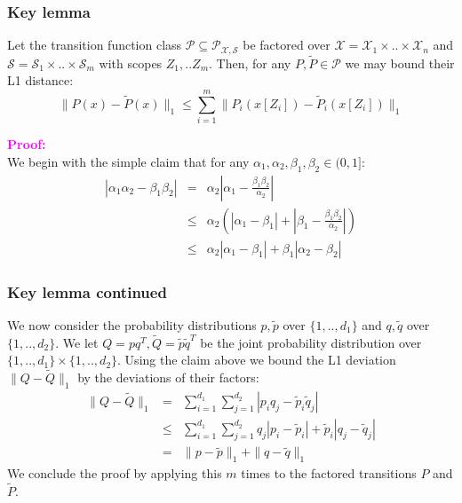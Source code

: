 \documentclass{beamer}
\newcommand{\Xc}{\mathcal{X}}
\newcommand{\Pc}{\mathcal{P}}
\newcommand{\Sc}{\mathcal{S}}
\newcommand{\hilite}[1]{\textcolor{magenta}{\textbf{#1}}}
\begin{document}
\begin{frame}
\frametitle{Key lemma}
\begin{lemma}
Let the transition function class $\Pc \subseteq \Pc_{\Xc,\Sc}$ be factored over $\Xc = \Xc_1 \times .. \times \Xc_n$ and $\Sc = \Sc_1 \times .. \times \Sc_m$ with scopes  $Z_1, .. Z_m$.
Then, for any $P,\tilde{P} \in \Pc$ we may bound their L1 distance:
$$ \| P(x) - \tilde{P}(x) \|_1 \le \sum_{i=1}^m \|P_i(x[Z_i]) - \tilde{P}_i(x[Z_i]) \|_1 $$
\end{lemma}
\hilite{Proof:}\\
We begin with the simple claim that for any $ \alpha_1, \alpha_2, \beta_1, \beta_2 \in (0,1]$:
\begin{eqnarray*}
    | \alpha_1 \alpha_2 - \beta_1 \beta_2 | &=& \alpha_2 \left| \alpha_1 - \frac{\beta_1 \beta_2}{\alpha_2} \right| \\
    &\le& \alpha_2 \left( \left|\alpha_1 - \beta_1 \right| + \left|\beta_1 - \frac{\beta_1 \beta_2}{\alpha_2} \right| \right) \\
    &\le& \alpha_2 \left| \alpha_1 - \beta_1 \right| + \beta_1 \left| \alpha_2 - \beta_2 \right|
\end{eqnarray*}
\end{frame}


\begin{frame}
\frametitle{Key lemma continued}
We now consider the probability distributions $p, \tilde{p} $ over $\{1,..,d_1\}$ and $q,\tilde{q} $ over $\{1,..,d_2\}$.
We let $Q = p q^T, \tilde{Q} = \tilde{p} \tilde{q}^T$ be the joint probability distribution over $\{1,..,d_1\} \times \{1,..,d_2\}$.
Using the claim above we bound the L1 deviation $\| Q - \tilde{Q} \|_1$ by the deviations of their factors:
\begin{eqnarray*}
    \| Q - \tilde{Q} \|_1 %
    &=& \sum_{i=1}^{d_1} \sum_{j=1}^{d_2} | p_i q_j - \tilde{p}_i \tilde{q}_j | \\
    &\le& \sum_{i=1}^{d_1} \sum_{j=1}^{d_2} q_j | p_i - \tilde{p}_i | + \tilde{p}_i | q_j - \tilde{q}_j | \\
    &=& \| p - \tilde{p} \|_1 + \|q - \tilde{q} \|_1
\end{eqnarray*}
We conclude the proof by applying this $m$ times to the factored transitions $P$ and $\tilde{P}$.
\end{frame}
\end{document}
